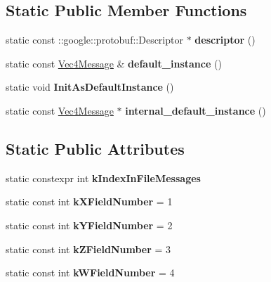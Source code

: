 \subsection*{Static Public Member Functions}
\begin{DoxyCompactItemize}
\item 
\mbox{\label{classtbMath_1_1Vec4Message_afce0fcccbc835c858f6aaf8b255c927f}} 
static const \+::google\+::protobuf\+::\+Descriptor $\ast$ {\bfseries descriptor} ()
\item 
\mbox{\label{classtbMath_1_1Vec4Message_a2faf74f59ec9220f420d128c522d81d2}} 
static const \hyperlink{classtbMath_1_1Vec4Message}{Vec4\+Message} \& {\bfseries default\+\_\+instance} ()
\item 
\mbox{\label{classtbMath_1_1Vec4Message_a0338c259e70012df4167bba8d0f5f790}} 
static void {\bfseries Init\+As\+Default\+Instance} ()
\item 
\mbox{\label{classtbMath_1_1Vec4Message_a02bcd14274134cc0ae7f04f7ca82cc59}} 
static const \hyperlink{classtbMath_1_1Vec4Message}{Vec4\+Message} $\ast$ {\bfseries internal\+\_\+default\+\_\+instance} ()
\end{DoxyCompactItemize}
\subsection*{Static Public Attributes}
\begin{DoxyCompactItemize}
\item 
static constexpr int {\bfseries k\+Index\+In\+File\+Messages}
\item 
\mbox{\label{classtbMath_1_1Vec4Message_a0d029426f13be7c2e456929a35993e23}} 
static const int {\bfseries k\+X\+Field\+Number} = 1
\item 
\mbox{\label{classtbMath_1_1Vec4Message_acd68dad28ce67a0cfb63fcf8e88dfb51}} 
static const int {\bfseries k\+Y\+Field\+Number} = 2
\item 
\mbox{\label{classtbMath_1_1Vec4Message_a36ed2c80e7b5ae7de0cf12ecbc7d6571}} 
static const int {\bfseries k\+Z\+Field\+Number} = 3
\item 
\mbox{\label{classtbMath_1_1Vec4Message_a00af7692331e89a5253b9c4398d2dc9f}} 
static const int {\bfseries k\+W\+Field\+Number} = 4
\end{DoxyCompactItemize}
